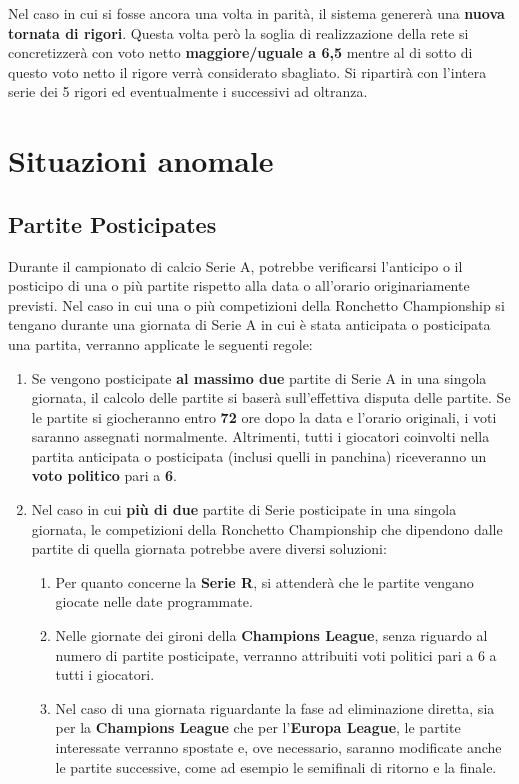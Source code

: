 \documentclass[12pt]{article}
\begin{document}
Nel caso in cui si fosse ancora una volta in parità, il sistema genererà una \textbf{nuova tornata di rigori}. Questa volta però la soglia di realizzazione della rete si concretizzerà con voto netto \textbf{maggiore/uguale a 6,5} mentre al di sotto di questo voto netto il rigore verrà considerato sbagliato. Si ripartirà con l'intera serie dei 5 rigori ed eventualmente i successivi ad oltranza.

\newpage
\section{Situazioni anomale}

\subsection{Partite Posticipates}
Durante il campionato di calcio Serie A, potrebbe verificarsi l'anticipo o il posticipo di una o più partite rispetto alla data o all'orario originariamente previsti. Nel caso in cui una o più competizioni della Ronchetto Championship si tengano durante una giornata di Serie A in cui è stata anticipata o posticipata una partita, verranno applicate le seguenti regole:

\begin{enumerate}
    \item Se vengono posticipate \textbf{al massimo due} partite di Serie A in una singola giornata, il calcolo delle partite si baserà sull'effettiva disputa delle partite. Se le partite si giocheranno entro \textbf{72} ore dopo la data e l'orario originali, i voti saranno assegnati normalmente. Altrimenti, tutti i giocatori coinvolti nella partita anticipata o posticipata (inclusi quelli in panchina) riceveranno un \textbf{voto politico} pari a \textbf{6}.
    \item Nel caso in cui \textbf{più di due} partite di Serie posticipate in una singola giornata, le competizioni della Ronchetto Championship che dipendono dalle partite di quella giornata potrebbe avere diversi soluzioni:
    \begin{enumerate}
        \item Per quanto concerne la \textbf{Serie R}, si attenderà che le partite vengano giocate nelle date programmate.
    
        \item Nelle giornate dei gironi della \textbf{Champions League}, senza riguardo al numero di partite posticipate, verranno attribuiti voti politici pari a 6 a tutti i giocatori.
        
        \item Nel caso di una giornata riguardante la fase ad eliminazione diretta, sia per la \textbf{Champions League} che per l'\textbf{Europa League}, le partite interessate verranno spostate e, ove necessario, saranno modificate anche le partite successive, come ad esempio le semifinali di ritorno e la finale.
    \end{enumerate}    
\end{enumerate}
\end{document}
